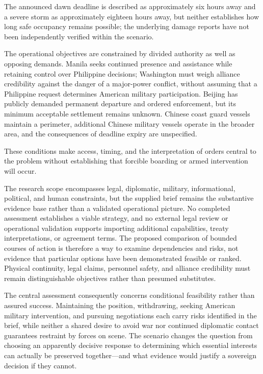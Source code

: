 \documentclass[11pt]{article}
\begin{document}
The announced dawn deadline is described as approximately six hours away and a severe storm as approximately eighteen hours away, but neither establishes how long safe occupancy remains possible; the underlying damage reports have not been independently verified within the scenario.

The operational objectives are constrained by divided authority as well as opposing demands. Manila seeks continued presence and assistance while retaining control over Philippine decisions; Washington must weigh alliance credibility against the danger of a major-power conflict, without assuming that a Philippine request determines American military participation. Beijing has publicly demanded permanent departure and ordered enforcement, but its minimum acceptable settlement remains unknown. Chinese coast guard vessels maintain a perimeter, additional Chinese military vessels operate in the broader area, and the consequences of deadline expiry are unspecified.

These conditions make access, timing, and the interpretation of orders central to the problem without establishing that forcible boarding or armed intervention will occur.

The research scope encompasses legal, diplomatic, military, informational, political, and human constraints, but the supplied brief remains the substantive evidence base rather than a validated operational picture. No completed assessment establishes a viable strategy, and no external legal review or operational validation supports importing additional capabilities, treaty interpretations, or agreement terms. The proposed comparison of bounded courses of action is therefore a way to examine dependencies and risks, not evidence that particular options have been demonstrated feasible or ranked. Physical continuity, legal claims, personnel safety, and alliance credibility must remain distinguishable objectives rather than presumed substitutes.

The central assessment consequently concerns conditional feasibility rather than assured success. Maintaining the position, withdrawing, seeking American military intervention, and pursuing negotiations each carry risks identified in the brief, while neither a shared desire to avoid war nor continued diplomatic contact guarantees restraint by forces on scene. The scenario changes the question from choosing an apparently decisive response to determining which essential interests can actually be preserved together—and what evidence would justify a sovereign decision if they cannot.
\end{document}
